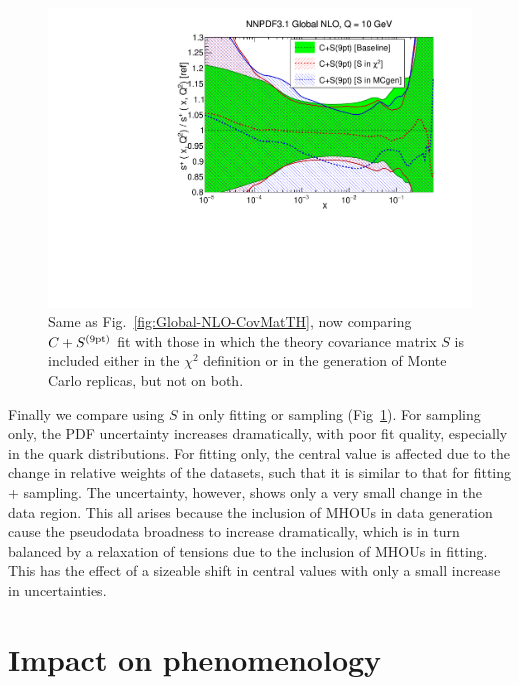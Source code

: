 \begin{figure}[h]
\begin{center}
   \includegraphics[scale=0.35]{mhous/plots/xsp-Global-NLO-CovMatTH-tests.pdf}
   \caption{\small Same as Fig.~\ref{fig:Global-NLO-CovMatTH}, now comparing $C+S^{(\rm 9pt)}$ fit with those in which
     the theory covariance matrix $S$ is included either in the $\chi^2$
     definition or in the generation of Monte Carlo replicas, but not on both.
    \label{fig:Global-NLO-CovMatTH-tests} }
  \end{center}
\end{figure}
Finally we compare using $S$ in only fitting or sampling (Fig~\ref{fig:Global-NLO-CovMatTH-tests}). For sampling only, the PDF uncertainty increases dramatically, with poor fit quality, especially in the quark distributions. For fitting only, the central value is affected due to the change in relative weights of the datasets, such that it is similar to that for fitting + sampling. The uncertainty, however, shows only a very small change in the data region. This all arises because the inclusion of MHOUs in data generation cause the pseudodata broadness to increase dramatically, which is in turn balanced by a relaxation of tensions due to the inclusion of MHOUs in fitting. This has the effect of a sizeable shift in central values with only a small increase in uncertainties. 


\section{Impact on phenomenology}
\label{sec:mhoupheno}
